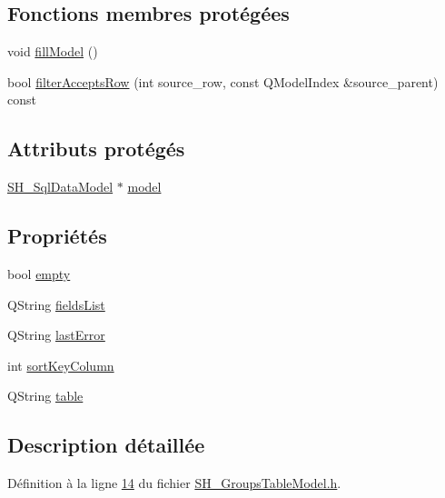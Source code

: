 \subsection*{Fonctions membres protégées}
\begin{DoxyCompactItemize}
\item 
void \hyperlink{classSH__GroupsTableModel_a0c9ca761a65824926392658d33ad0fa9}{fill\-Model} ()
\item 
bool \hyperlink{classSH__ExtendedProxyModel_a5c9a68f10afb83af24896beac56e0ae3}{filter\-Accepts\-Row} (int source\-\_\-row, const Q\-Model\-Index \&source\-\_\-parent) const 
\end{DoxyCompactItemize}
\subsection*{Attributs protégés}
\begin{DoxyCompactItemize}
\item 
\hyperlink{classSH__SqlDataModel}{S\-H\-\_\-\-Sql\-Data\-Model} $\ast$ \hyperlink{classSH__ExtendedProxyModel_a8c8b8930c6b1abd9bbb1dce1fdc9690b}{model}
\end{DoxyCompactItemize}
\subsection*{Propriétés}
\begin{DoxyCompactItemize}
\item 
bool \hyperlink{classSH__ExtendedProxyModel_a9e22d17af7776aca8052084cc33c3442}{empty}
\item 
Q\-String \hyperlink{classSH__ExtendedProxyModel_a15e779ba92384a57442d6bd79ef3d1d1}{fields\-List}
\item 
Q\-String \hyperlink{classSH__ExtendedProxyModel_a1597853dfae8c3972ef3396293d5d0fc}{last\-Error}
\item 
int \hyperlink{classSH__ExtendedProxyModel_a47e2d0b99b84fb066438db667dd1ad26}{sort\-Key\-Column}
\item 
Q\-String \hyperlink{classSH__ExtendedProxyModel_a7eef4557a77444e9ce5c24c180392bfa}{table}
\end{DoxyCompactItemize}


\subsection{Description détaillée}


Définition à la ligne \hyperlink{SH__GroupsTableModel_8h_source_l00014}{14} du fichier \hyperlink{SH__GroupsTableModel_8h_source}{S\-H\-\_\-\-Groups\-Table\-Model.\-h}.



